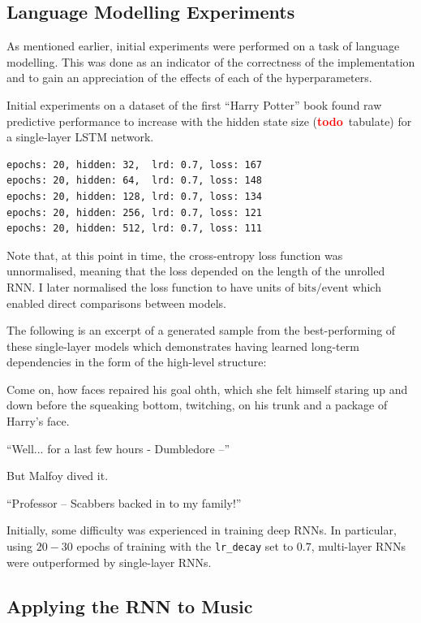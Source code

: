 \documentclass[12pt,a4paper,twoside,openright]{report}
\newcommand{\todo}{\textcolor{red}{\textbf{todo}~}}
\begin{document}
\subsection{Language Modelling Experiments}

As mentioned earlier, initial experiments were performed on a task of language
modelling. This was done as an indicator of the correctness of the
implementation and to gain an appreciation of the effects of each of the
hyperparameters.

Initial experiments on a dataset of the first ``Harry Potter'' book found raw
predictive performance to increase with the hidden state size (\todo tabulate)
for a single-layer LSTM network.

\begin{verbatim}
epochs: 20, hidden: 32,  lrd: 0.7, loss: 167
epochs: 20, hidden: 64,  lrd: 0.7, loss: 148
epochs: 20, hidden: 128, lrd: 0.7, loss: 134
epochs: 20, hidden: 256, lrd: 0.7, loss: 121
epochs: 20, hidden: 512, lrd: 0.7, loss: 111
\end{verbatim}

Note that, at this point in time, the cross-entropy loss function was
unnormalised, meaning that the loss depended on the length of the unrolled RNN.
I later normalised the loss function to have units of
$\mathrm{bits}/\mathrm{event}$ which enabled direct comparisons between models.

The following is an excerpt of a generated sample from the best-performing of
these single-layer models which demonstrates having learned long-term
dependencies in the form of the high-level structure:

\begin{displayquote}
Come on, how faces repaired his goal ohth, which she felt himself staring up and
down before the squeaking bottom, twitching, on his trunk and a package of
Harry's face.

``Well... for a last few hours - Dumbledore --''

But Malfoy dived it.

``Professor -- Scabbers backed in to my family!''
\end{displayquote}
\vspace{4mm}

Initially, some difficulty was experienced in training deep RNNs. In particular,
using $20-30$ epochs of training with the \texttt{lr\_decay} set to $0.7$,
multi-layer RNNs were outperformed by single-layer RNNs.

\subsection{Applying the RNN to Music}
\end{document}
